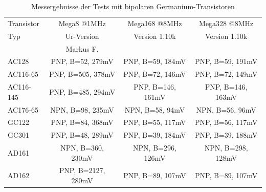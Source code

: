 \begin{table}[H]
  \begin{center}
    \begin{tabular}{| l | c | c | c |}
    \hline
 Transistor & Mega8 @1MHz          & Mega168 @8MHz       & Mega328 @8MHz    \\
    Typ     & Ur-Version          & Version 1.10k       & Version 1.10k  \\
            & Markus F.           &                     &        \\
    \hline
    \hline
AC128       & PNP, B=52, 279mV    & PNP, B=59, 184mV    & PNP, B=59, 191mV    \\
    \hline
AC116-65    & PNP, B=505, 378mV   & PNP, B=72, 146mV    & PNP, B=72, 149mV    \\
    \hline
AC116-145   & PNP, B=485, 294mV   & PNP, B=146, 161mV    & PNP, B=146, 163mV   \\
    \hline
AC176-65    & NPN, B=98, 235mV    & NPN, B=58, 94mV    & NPN, B=56, 96mV     \\
    \hline
GC122       & PNP, B=84, 368mV    & PNP, B=55, 117mV    & PNP, B=56, 117mV    \\
    \hline
GC301       & PNP, B=48, 289mV    & PNP, B=39, 184mV    & PNP, B=39, 188mV    \\
    \hline
AD161       & NPN, B=360, 230mV   & NPN, B=296, 126mV   & NPN, B=298, 128mV    \\
    \hline
AD162       & PNP, B=2127, 280mV  & PNP, B=89, 107mV    & PNP, B=89, 107mV    \\
    \hline
    \end{tabular}
  \end{center}
  \caption{Messergebnisse der Tests mit bipolaren Germanium-Transistoren}
  \label{tab:germanium} 
\end{table}


